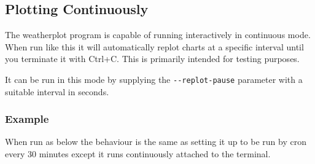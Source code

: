 \documentclass[a4paper,10pt,draft]{book}
\begin{document}
\subsection{Plotting Continuously}

The weatherplot program is capable of running interactively in continuous mode. When run like this it will automatically replot charts at a specific interval until you terminate it with Ctrl+C. This is primarily intended for testing purposes.

It can be run in this mode by supplying the \verb|--replot-pause| parameter
with a suitable interval in seconds.

\subsubsection{Example}

When run as below the behaviour is the same as setting it up to be run by cron every 30 minutes except it runs continuously attached to the terminal.
\end{document}
